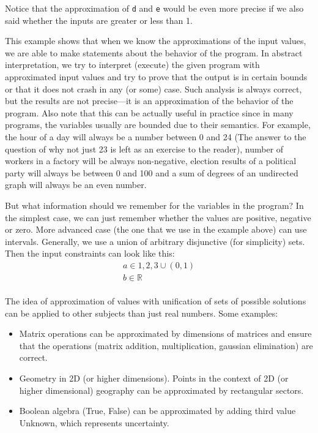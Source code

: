 Notice that the approximation of \verb|d| and \verb|e| would be even more precise if we also said whether the inputs
are greater or less than 1.

This example shows that when we know the approximations of the input values, we are able to make statements about the
behavior of the program.
In abstract interpretation, we try to interpret (execute) the given program with approximated input values and try to
prove that the output is in certain bounds or that it does not crash in any (or some) case.
Such analysis is always correct, but the results are not precise---it is an approximation of the behavior of the program.
Also note that this can be actually useful in practice since in many programs, the variables usually are bounded due to
their semantics.
For example, the hour of a day will always be a number between 0 and 24 (The answer to the question of why not just 23 is
left as an exercise to the reader),
number of workers in a factory will be always non-negative, election results of a political party will always be
between 0 and 100 and a sum of degrees of an undirected graph will always be an even number.

But what information should we remember for the variables in the program?
In the simplest case, we can just remember whether the values are positive, negative or zero.
More advanced case (the one that we use in the example above) can use intervals.
Generally, we use a union of arbitrary disjunctive (for simplicity) sets.
Then the input constraints can look like this:
\begin{gather*}
    a \in {1, 2, 3} \cup (0, 1)\\
    b \in \mathbb{R}\\
\end{gather*}

The idea of approximation of values with unification of sets of possible solutions can be applied to other subjects than
just real numbers.
Some examples:
\begin{itemize}
    \item Matrix operations can be approximated by dimensions of matrices and ensure that the operations
    (matrix addition, multiplication, gaussian elimination) are correct.

    \item Geometry in 2D (or higher dimensions).
     Points in the context of 2D (or higher dimensional) geography can be approximated by rectangular sectors.

    \item Boolean algebra (True, False) can be approximated by adding third value Unknown, which represents uncertainty.

\end{itemize}


